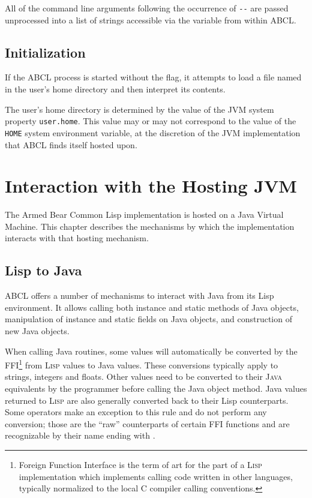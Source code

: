 \documentclass[10pt]{book}
\begin{document}
All of the command line arguments following the occurrence of \verb+--+
are passed unprocessed into a list of strings accessible via the
variable  from within ABCL.

\section{Initialization}

If the \textsc{ABCL} process is started without the
 flag, it attempts to load a file
named  in the user's home directory and then interpret
its contents.

The user's home directory is determined by the value of the JVM system
property \texttt{user.home}.  This value may or may not correspond
to the value of the \texttt{HOME} system environment variable, at the
discretion of the JVM implementation that \textsc{ABCL} finds itself
hosted upon.

\chapter{Interaction with the Hosting JVM}

%

The Armed Bear Common Lisp implementation is hosted on a Java Virtual
Machine.  This chapter describes the mechanisms by which the
implementation interacts with that hosting mechanism.

\section{Lisp to Java}
\label{section:lisp-java}

\textsc{ABCL} offers a number of mechanisms to interact with Java from its
Lisp environment. It allows calling both instance and static methods
of Java objects, manipulation of instance and static fields on Java
objects, and construction of new Java objects.

When calling Java routines, some values will automatically be
converted by the FFI\footnote{Foreign Function Interface is the term
  of art for the part of a \textsc{Lisp} implementation which implements
  calling code written in other languages, typically normalized to the
  local C compiler calling conventions.}  from \textsc{Lisp} values to Java
values. These conversions typically apply to strings, integers and
floats. Other values need to be converted to their \textsc{Java} equivalents by
the programmer before calling the Java object method. Java values
returned to \textsc{Lisp} are also generally converted back to their Lisp
counterparts. Some operators make an exception to this rule and do not
perform any conversion; those are the ``raw'' counterparts of certain
FFI functions and are recognizable by their name ending with
.
\end{document}
